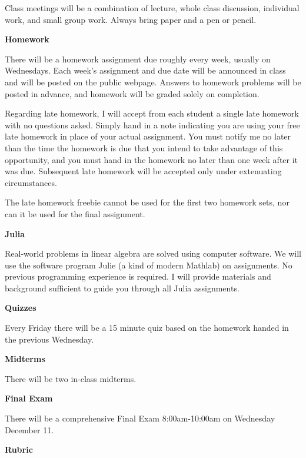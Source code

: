 \documentclass[12pt]{article}
\begin{document}
Class meetings will be a combination of lecture, whole class discussion, individual work, and small group work. Always bring paper and a pen or pencil. 

{\textbf{\large{Homework}}}

There will be a homework assignment due roughly every week, usually on Wednesdays. Each week’s assignment and due date will be announced in class and will be posted on the public webpage. Answers to homework problems will be posted in advance, and homework will be graded solely on completion.

Regarding late homework, I will accept from each student a single late homework with no
questions asked. Simply hand in a note indicating you are using your free late homework in
place of your actual assignment. You must notify me no later than the time the homework is
due that you intend to take advantage of this opportunity, and you must hand in the homework no later than one week after it was due. Subsequent late homework will be accepted only under extenuating circumstances.

The late homework freebie cannot be used for the first two homework sets, nor can it be used for the final assignment.

\newpage

{\textbf{\large{Julia}}}

Real-world problems in linear algebra are solved using computer software. We will use the software program Julie (a kind of modern Mathlab) on assignments. No previous programming experience is required. I will provide materials and background sufficient to guide you through all Julia assignments.

{\textbf{\large{Quizzes}}}

Every Friday there will be a 15 minute quiz based on the homework handed in the previous Wednesday.

%

{\textbf{\large{Midterms}}}

There will be two in-class midterms.

{\textbf{\large{Final Exam}}}

There will be a comprehensive Final Exam 8:00am-10:00am on Wednesday December 11.

{\textbf{\large{Rubric}}}
\end{document}
